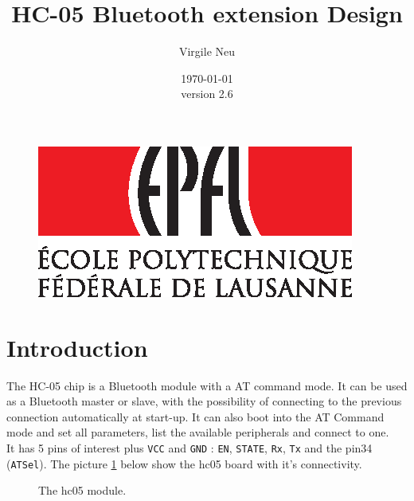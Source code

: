 \documentclass[11pt]{article}
\title{\textbf{HC-05 Bluetooth extension Design}}
\author{Virgile Neu}
\date{\today \\ version 2.6}
\begin{document}
\maketitle
    \begin{figure}
        \center
        \includegraphics[scale=0.9]{EPFL-Logo-CMJN.eps}
    \end{figure}
    \newpage
    
\tableofcontents

\newpage

\setcounter{page}{1}
\rfoot{\thepage}

\section{Introduction}

The HC-05 chip is a Bluetooth module with a AT command mode. It can be used as a Bluetooth master or slave, with the possibility of connecting to the previous connection automatically at start-up. It can also boot into the AT Command mode and set all parameters, list the available peripherals and connect to one.\\
It has 5 pins of interest plus \texttt{VCC} and \texttt{GND} : \texttt{EN}, \texttt{STATE}, \texttt{Rx}, \texttt{Tx} and the pin34 (\texttt{ATSel}). The picture \ref{hc05} below show the hc05 board with it's connectivity.
\begin{figure}[H]
        \caption{The hc05 module.}
        \label{hc05}
\end{figure}
\end{document}

